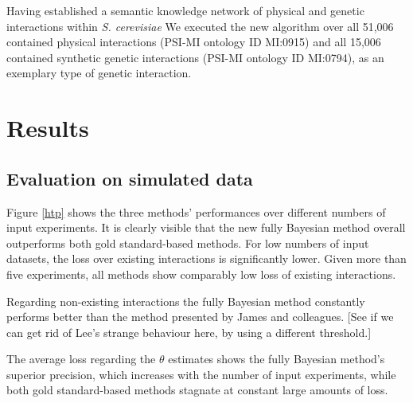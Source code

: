\documentclass{bioinfo}
\newcommand{\species}[1]{\textit{#1}}
\newcommand{\note}[1]{{\color{red}[#1]}}
\begin{document}
\begin{methods}
Having established a semantic knowledge network of physical and genetic interactions within \species{S. cerevisiae} We executed the new algorithm over all 51,006 contained physical interactions (PSI-MI ontology ID MI:0915) and all 15,006 contained synthetic genetic interactions (PSI-MI ontology ID MI:0794), as an exemplary type of genetic interaction.

\end{methods}

\section{Results}

\subsection{Evaluation on simulated data}

Figure \ref{htp} shows the three methods' performances over different numbers of input experiments. It is clearly visible that the new fully Bayesian method overall outperforms both gold standard-based methods. For low numbers of input datasets, the loss over existing interactions is significantly lower. Given more than five experiments, all methods show comparably low loss of existing interactions. 

Regarding non-existing interactions the fully Bayesian method constantly performs better than the method presented by James and colleagues. \note{See if we can get rid of Lee's strange behaviour here, by using a different threshold.}

The average loss regarding the $\theta$ estimates shows the fully Bayesian method's superior precision, which increases with the number of input experiments, while both gold standard-based methods stagnate at constant large amounts of loss.
\end{document}
